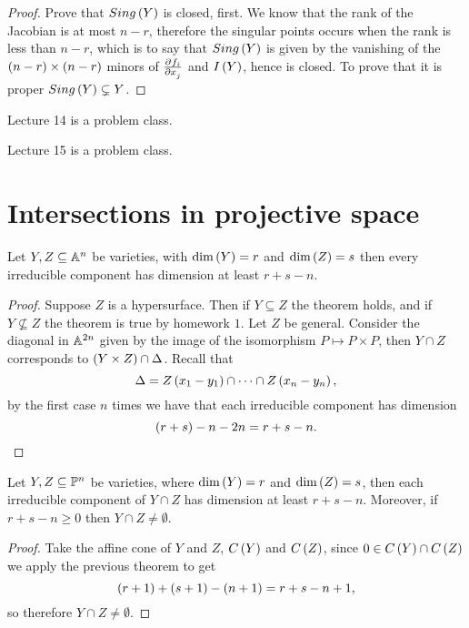\begin{proof}
Prove that $ Sing\br{Y} $ is closed, first. We know that the rank of the Jacobian is at most $ n - r $, therefore the singular points occurs when the rank is less than $ n - r $, which is to say that $ Sing\br{Y} $ is given by the vanishing of the $ \br{n - r} \times \br{n - r} $ minors of $ \tpd{f_i}{x_j} $ and $ I\br{Y} $, hence is closed. To prove that it is proper $ Sing\br{Y} \subsetneq Y $.
\end{proof}


Lecture 14 is a problem class.


Lecture 15 is a problem class.

\pagebreak

\section{Intersections in projective space}


\begin{theorem}
Let $ Y, Z \subseteq \A^n $ be varieties, with $ \dim\br{Y} = r $ and $ \dim\br{Z} = s $ then every irreducible component has dimension at least $ r + s - n $.
\end{theorem}

\begin{proof}
Suppose $ Z $ is a hypersurface. Then if $ Y \subseteq Z $ the theorem holds, and if $ Y \nsubseteq Z $ the theorem is true by homework $ 1 $. Let $ Z $ be general. Consider the diagonal in $ \A^{2n} $ given by the image of the isomorphism $ P \mapsto P \times P $, then $ Y \cap Z $ corresponds to $ \br{Y \times Z} \cap \Delta $. Recall that
$$ \Delta = Z\br{x_1 - y_1} \cap \dots \cap Z\br{x_n - y_n}, $$
by the first case $ n $ times we have that each irreducible component has dimension
$$ \br{r + s} - n - 2n = r + s - n. $$
\end{proof}

\begin{theorem}
Let $ Y, Z \subseteq \P^n $ be varieties, where $ \dim\br{Y} = r $ and $ \dim\br{Z} = s $, then each irreducible component of $ Y \cap Z $ has dimension at least $ r + s - n $. Moreover, if $ r + s - n \ge 0 $ then $ Y \cap Z \ne \emptyset $.
\end{theorem}

\begin{proof}
Take the affine cone of $ Y $ and $ Z $, $ C\br{Y} $ and $ C\br{Z} $, since $ 0 \in C\br{Y} \cap C\br{Z} $ we apply the previous theorem to get
$$ \br{r + 1} + \br{s + 1} - \br{n + 1} = r + s - n + 1, $$
so therefore $ Y \cap Z \ne \emptyset $.
\end{proof}

